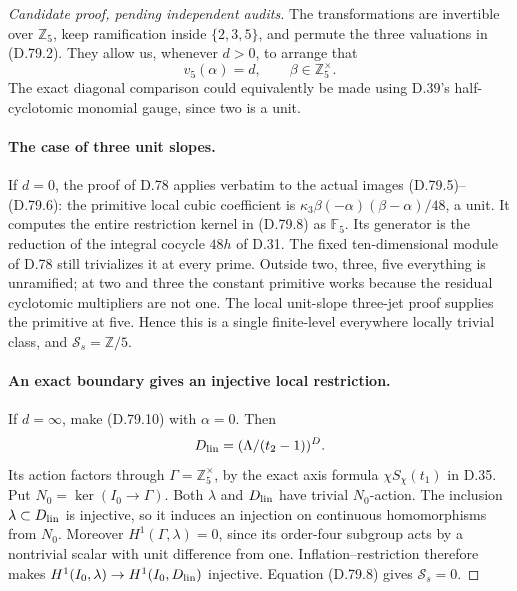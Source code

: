 \begin{proof}[Candidate proof, pending independent audits]
The transformations are invertible over \(\mathbb Z_5\), keep
ramification inside \(\{2,3,5\}\), and permute the three
valuations in (D.79.2). They allow us, whenever \(d>0\), to
arrange that
\[
 v_5(\alpha)=d,\qquad \beta\in\mathbb Z_5^\times.
                                                               \tag{D.79.10}
\]
The exact diagonal comparison could equivalently be made using
D.39's half-cyclotomic monomial gauge, since two is a unit.

\paragraph{The case of three unit slopes.}
If \(d=0\), the proof of D.78 applies verbatim to the actual
images (D.79.5)--(D.79.6): the primitive local cubic coefficient
is \(\kappa_3\beta(-\alpha)(\beta-\alpha)/48\), a unit.
It computes the entire restriction kernel in (D.79.8) as
\(\mathbb F_5\). Its generator is the reduction of the integral
cocycle \(48h\) of D.31. The fixed ten-dimensional module of
D.78 still trivializes it at every prime. Outside two, three,
five everything is unramified; at two and three the constant
primitive works because the residual cyclotomic multipliers
are not one. The local unit-slope three-jet proof supplies
the primitive at five. Hence this is a single finite-level
everywhere locally trivial class, and
\(\mathcal S_s=\mathbb Z/5\).

\paragraph{An exact boundary gives an injective local restriction.}
If \(d=\infty\), make (D.79.10) with \(\alpha=0\).
Then
\[
 D_{\rm lin}=(\Lambda/(t_2-1))^D.
\]
Its action factors through \(\Gamma=\mathbb Z_5^\times\),
by the exact axis formula \(\chi S_\chi(t_1)\) in D.35.
Put \(N_0=\ker(I_0\to\Gamma)\). Both \(\lambda\) and
\(D_{\rm lin}\) have trivial \(N_0\)-action. The inclusion
\(\lambda\subset D_{\rm lin}\) is injective, so it induces
an injection on continuous homomorphisms from \(N_0\).
Moreover
\(H^1(\Gamma,\lambda)=0\), since its order-four subgroup
acts by a nontrivial scalar with unit difference from one.
Inflation--restriction therefore makes
\(H^1(I_0,\lambda)\to H^1(I_0,D_{\rm lin})\) injective.
Equation (D.79.8) gives \(\mathcal S_s=0\).


\end{proof}
